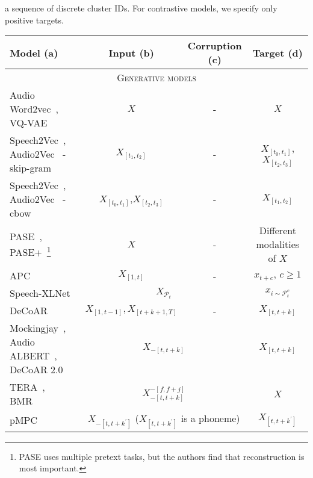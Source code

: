 \begin{table*}[!htb]
{    a sequence of discrete cluster IDs.
    For contrastive models, we specify only positive targets.
    }
\centering
\renewcommand*\arraystretch{1.2}{
\begin{tabular}{l|c|c|c}
    \toprule
    \textbf{Model} (a) & \textbf{Input} (b) & \textbf{Corruption} (c) & \textbf{Target} (d) \\
    \midrule
    \midrule
    \multicolumn{4}{c}{\textsc{Generative models}} \\
    \midrule
    \midrule
    Audio Word2vec~\cite{Chung2016AudioWord2Vec}, VQ-VAE~\cite{vqvae}     & $X$ &   \textsc{-}    &  $X$  \\ %
    \midrule  
    Speech2Vec~\cite{chung2018speech2vec}, Audio2Vec~\cite{tagliasacchi2020pre} - skip-gram    & $X_{[t_1,t_2]}$  &     \textsc{-}   &    $X_{[t_0,t_1]}$,$X_{[t_2,t_3]}$     \\
    \midrule 
    Speech2Vec~\cite{chung2018speech2vec}, Audio2Vec~\cite{tagliasacchi2020pre} - cbow    & $X_{[t_0,t_1]}$,$X_{[t_2,t_3]}$   &     \textsc{-}   &    $X_{[t_1,t_2]}$   \\
    \midrule 
    PASE~\cite{pascual2019learning}, PASE+~\cite{ravanelli2020multi}\footnote{PASE uses multiple pretext tasks, but the authors find that reconstruction is most important.}       & $X$ &  \textsc{-}   &  Different modalities of $X$  \\
    \midrule 
    APC~\cite{chung2019unsupervised,chung20e_interspeech}         & $X_{[1,t]}$   & \textsc{-}              & $x_{t+c},\, c\geq1$    \\ %
    \midrule
    Speech-XLNet \cite{song20d_interspeech}     & \multicolumn{2}{c|}{$X_{\mathcal{P}_{t}}$}   &     $x_{i\sim\mathcal{P}^c_{t}}$  \\ %
    \midrule  
    DeCoAR~\cite{ling2020deep}     & $X_{[1,t-1]}, X_{[t+k+1,T]}$ & \textsc{-} & $X_{[t,t+k]}$   \\
    \midrule
    Mockingjay~\cite{liu2020mockingjay}, Audio ALBERT~\cite{chi2020audio}, DeCoAR 2.0~\cite{ling2020decoar}   & \multicolumn{2}{c|}{$X_{-[t,t+k]}$}   & $X_{[t,t+k]}$    \\
    \midrule 
    TERA~\cite{liu2021tera}, BMR~\cite{wang2020unsupervised}  & \multicolumn{2}{c|}{$X_{-[t,t+k]}^{-[f,f+j]}$}       & $X$       \\
    \midrule
    pMPC~\cite{yue2021pMPC}      &  \multicolumn{2}{c|}{$X_{-[t,t+k^\prime]}$ ($X_{[t,t+k^\prime]}$ is a phoneme)}       & $X_{[t,t+k^\prime]}$    \\

\end{tabular}}
\end{table*}
